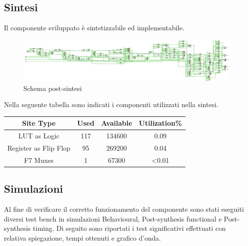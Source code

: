 \documentclass{article}
\begin{document}
\subsection{Sintesi}
Il componente sviluppato è sintetizzabile ed implementabile. 
\begin{figure}[H]
	\centering
	\includegraphics[width=1\textwidth]{Assets/schematic.eps}
	\caption{Schema post-sintesi}
\end{figure}
Nella seguente tabella sono indicati i componenti utilizzati nella sintesi.
\begin{center}
	\begin{tabular}{c|c|c|c}
		
		Site Type   & Used & Available & Utilization\% \\
		\hline
		LUT as Logic & 117 & 134600 & 0.09 \\
		
		Register as Flip Flop & 95 & 269200  & 0.04\\
		
		F7 Muxes & 1 & 67300 & <0.01\\
		
	\end{tabular}
\end{center}



\subsection{Simulazioni}
Al fine di verificare il corretto funzionamento del componente sono stati eseguiti diversi test bench in simulazioni Behavioural, Post-synthesis functional e Post-synthesis timing. 
Di seguito sono riportati i test significativi effettuati con relativa spiegazione, tempi ottenuti e grafico d'onda.
\end{document}
